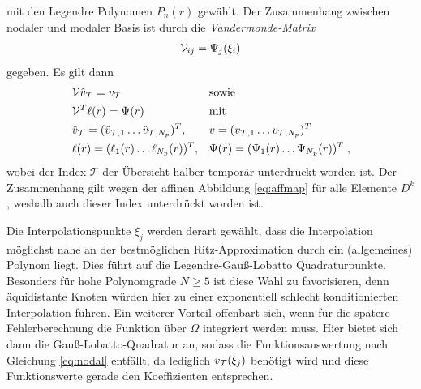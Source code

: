 mit den Legendre Polynomen $P_n(r)$ gewählt. Der Zusammenhang zwischen nodaler und modaler Basis ist durch die \emph{Vandermonde-Matrix}
\begin{equation}
  \begin{aligned}
    \mathcal{V}_{ij} = \Psi_j(\xi_i)
  \end{aligned}
\end{equation}
gegeben. Es gilt dann
  \begin{align}
    &\mathcal{V}\hat{v}_{\mathcal{T}} = v_{\mathcal{T}}        & &\text{sowie} \label{eq:nodalmodal}\\
    &\mathcal{V}^T\ell(r) = \Psi(r) & &\text{mit} \label{eq:ellPsi}\\
    &\hat{v}_{\mathcal{T}} = (\hat{v}_{\mathcal{T},1} \dots \hat{v}_{\mathcal{T},N_p})^T, & & v =(v_{\mathcal{T},1} \dots v_{\mathcal{T},N_p})^T \nonumber \\
    &\ell(r) = (\ell_1(r) \dots \ell_{N_p}(r))^T, & & \Psi(r) =(\Psi_1(r) \dots \Psi_{N_p}(r))^T \nonumber \; ,
  \end{align}
wobei der Index $\mathcal{T}$ der Übersicht halber temporär unterdrückt worden ist. Der Zusammenhang gilt wegen der affinen Abbildung \eqref{eq:affmap} für alle Elemente $D^k$, weshalb auch dieser Index unterdrückt worden ist.

Die Interpolationspunkte $\xi_j$ werden derart gewählt, dass die Interpolation möglichst nahe an der bestmöglichen Ritz-Approximation durch ein (allgemeines) Polynom liegt. Dies führt auf die Legendre-Gauß-Lobatto Quadraturpunkte. Besonders für hohe Polynomgrade $N\geq 5$ ist diese Wahl zu favorisieren, denn äquidistante Knoten würden hier zu einer exponentiell schlecht konditionierten Interpolation führen. Ein weiterer Vorteil offenbart sich, wenn für die spätere Fehlerberechnung die Funktion über $\Omega$ integriert werden muss. Hier bietet sich dann die Gauß-Lobatto-Quadratur an, sodass die Funktionsauswertung nach Gleichung \eqref{eq:nodal} entfällt, da lediglich $v_{\mathcal{T}}(\xi_j)$ benötigt wird und diese Funktionswerte gerade den Koeffizienten entsprechen.

